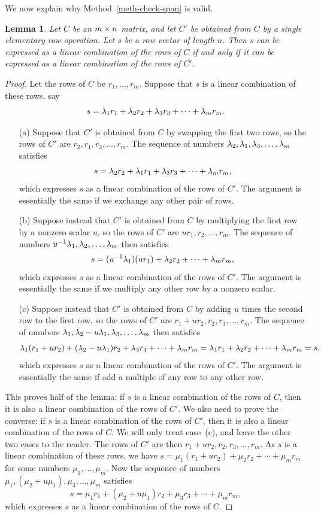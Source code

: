\documentclass[reqno]{amsart}
\newtheorem{lemma}[theorem]{Lemma}
\theoremstyle{definition}
\begin{document}
We now explain why Method~\ref{meth-check-span} is valid.
\begin{lemma}\label{lem-span-invariant}
 Let $C$ be an $m\times n$ matrix, and let $C'$ be obtained from $C$ by a
 single elementary row operation.  Let $s$ be a row vector of length
 $n$.  Then $s$ can be expressed as a linear combination of the rows
 of $C$ if and only if it can be expressed as a linear combination of
 the rows of $C'$.
\end{lemma}
\begin{proof}
 Let the rows of $C$ be $r_1,\dotsc,r_m$.  Suppose that $s$ is a
 linear combination of these rows, say
 \[ s=\lambda_1r_1+\lambda_2r_2+\lambda_3r_3+\dotsb+\lambda_mr_m. \]
 \begin{itemize}
  \item[(a)] Suppose that $C'$ is obtained from $C$ by swapping the
   first two rows, so the rows of $C'$ are $r_2,r_1,r_3,\dotsc,r_m$.
   The sequence of numbers $\lambda_2,\lambda_1,\lambda_3,\dotsc,\lambda_m$ satisfies
   \[ s=\lambda_2r_2+\lambda_1r_1+\lambda_3r_3+\dotsb+\lambda_mr_m, \]
   which expresses $s$ as a linear combination of the rows of $C'$.  The
   argument is essentially the same if we exchange any other pair of
   rows.
  \item[(b)] Suppose instead that $C'$ is obtained from $C$ by
   multiplying the first row by a nonzero scalar $u$, so the rows of
   $C'$ are $ur_1,r_2,\dotsc,r_m$.  The sequence of numbers
   $u^{-1}\lambda_1,\lambda_2,\dotsc,\lambda_m$ then satisfies
   \[ s = (u^{-1}\lambda_1)(ur_1)+\lambda_2r_2+\dotsb+\lambda_mr_m, \]
   which expresses $s$ as a linear combination of the rows of $C'$.  The
   argument is essentially the same if we multiply any other row by a
   nonzero scalar.
  \item[(c)] Suppose instead that $C'$ is obtained from $C$ by adding
   $u$ times the second row to the first row, so the rows of $C'$ are
   $r_1+ur_2,r_2,r_3,\dotsc,r_m$.  The sequence of numbers
   $\lambda_1,\lambda_2-u\lambda_1,\lambda_3,\dotsc,\lambda_m$ then satisfies
   \[ \lambda_1(r_1+ur_2)+(\lambda_2-u\lambda_1)r_2+\lambda_3r_3+\dotsb+\lambda_mr_m =
       \lambda_1r_1+\lambda_2r_2+\dotsb+\lambda_mr_m=s,
   \]
   which expresses $s$ as a linear combination of the rows of $C'$.  The
   argument is essentially the same if add a multiple of any row to
   any other row.
 \end{itemize}
 This proves half of the lemma: if $s$ is a linear combination of the
 rows of $C$, then it is also a linear combination of the rows of
 $C'$.  We also need to prove the converse: if $s$ is a linear
 combination of the rows of $C'$, then it is also a linear combination
 of the rows of $C$.  We will only treat case~(c), and leave the other
 two cases to the reader.  The rows of $C'$ are then
 $r_1+ur_2,r_2,r_3,\dotsc,r_m$.  As $s$ is a linear combination of
 these rows, we have $s=\mu_1(r_1+ur_2)+\mu_2r_2+\dotsb+\mu_mr_m$ for
 some numbers $\mu_1,\dotsc,\mu_m$.  Now the sequence of numbers
 $\mu_1,(\mu_2+u\mu_1),\mu_3,\dotsc,\mu_m$ satisfies
 \[ s = \mu_1r_1+(\mu_2+u\mu_1)r_2+\mu_3r_3+\dotsb+\mu_mr_m, \]
 which expresses $s$ as a linear combination of the rows of $C$.
\end{proof}
\end{document}
